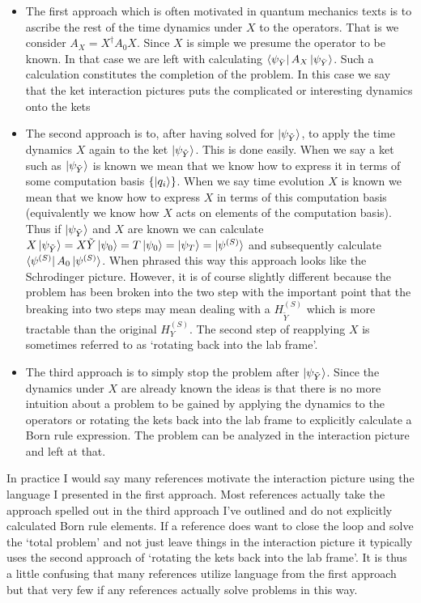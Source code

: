\documentclass[12pt]{article}
\begin{document}
\begin{itemize}
\item{The first approach which is often motivated in quantum mechanics texts is to ascribe the rest of the time dynamics under $X$ to the operators. That is we consider $A_X = X^{\dag}A_0X$. Since $X$ is simple we presume the operator to be known. In that case we are left with calculating $\bra{\psi_{\tilde{Y}}}A_X\ket{\psi_{\tilde{Y}}}$. Such a calculation constitutes the completion of the problem. In this case we say that the ket interaction pictures puts the complicated or interesting dynamics onto the kets}
\item{The second approach is to, after having solved for $\ket{\psi_{\tilde{Y}}}$, to apply the time dynamics $X$ again to the ket $\ket{\psi_{\tilde{Y}}}$. This is done easily. When we say a ket such as $\ket{\psi_{\tilde{Y}}}$ is known we mean that we know how to express it in terms of some computation basis $\{\ket{q_i}\}$. When we say time evolution $X$ is known we mean that we know how to express $X$ in terms of this computation basis (equivalently we know how $X$ acts on elements of the computation basis). Thus if $\ket{\psi_{\tilde{Y}}}$ and $X$ are known we can calculate $X\ket{\psi_{\tilde{Y}}} = X\tilde{Y}\ket{\psi_0} = T\ket{\psi_0} = \ket{\psi_T} = \ket{\psi^{(S)}}$ and subsequently calculate $\bra{\psi^{(S)}}A_0\ket{\psi^{(S)}}$. When phrased this way this approach looks like the Schrodinger picture. However, it is of course slightly different because the problem has been broken into the two step with the important point that the breaking into two steps may mean dealing with a $H_{\tilde{Y}}^{(S)}$ which is more tractable than the original $H_Y^{(S)}$. The second step of reapplying $X$ is sometimes referred to as `rotating back into the lab frame'.}
\item{The third approach is to simply stop the problem after $\ket{\psi_{\tilde{Y}}}$. Since the dynamics under $X$ are already known the ideas is that there is no more intuition about a problem to be gained by applying the dynamics to the operators or rotating the kets back into the lab frame to explicitly calculate a Born rule expression. The problem can be analyzed in the interaction picture and left at that.}
\end{itemize}

In practice I would say many references motivate the interaction picture using the language I presented in the first approach. 
Most references actually take the approach spelled out in the third approach I've outlined and do not explicitly calculated Born rule elements.
If a reference does want to close the loop and solve the `total problem' and not just leave things in the interaction picture it typically uses the second approach of `rotating the kets back into the lab frame'.
It is thus a little confusing that many references utilize language from the first approach but that very few if any references actually solve problems in this way.
\end{document}
